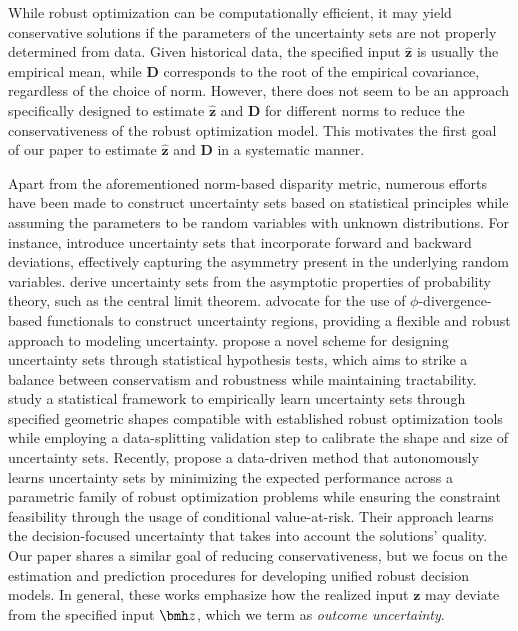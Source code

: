 \documentclass[opre, blindrev]{informs4}
\newcommand{\1}[1]{\mathds{1}{\left(#1\right)}}
\begin{document}
While robust optimization can be computationally efficient, it may yield conservative solutions if the parameters of the uncertainty sets are not properly determined from data. Given historical data, the specified input \( \bm{\hat{z}} \) is usually the empirical mean, while \( \mathbf{D} \) corresponds to the root of the empirical covariance, regardless of the choice of norm. However, there does not seem to be an approach specifically designed to estimate \( \bm{\hat{z}} \) and \( \mathbf{D} \) for different norms to reduce the conservativeness of the robust optimization model. This motivates the first goal of our paper to estimate \( \bm{\hat{z}} \) and \( \mathbf{D} \) in a systematic manner.

Apart from the aforementioned norm-based disparity metric, numerous efforts have been made to construct uncertainty sets based on statistical principles while assuming the parameters to be random variables with unknown distributions. For instance, \cite{Chen_Sim_Sun_2007robust} introduce uncertainty sets that incorporate forward and backward deviations, effectively capturing the asymmetry present in the underlying random variables. \cite{bandi2012tractable} derive uncertainty sets from the asymptotic properties of probability theory, such as the central limit theorem. \cite{ben2013robust} advocate for the use of $\phi$-divergence-based functionals to construct uncertainty regions, providing a flexible and robust approach to modeling uncertainty. \cite{Bertsimas_Gupta_Kallus_2018data} propose a novel scheme for designing uncertainty sets through statistical hypothesis tests, which aims to strike a balance between conservatism and robustness while maintaining tractability. \cite{hong2021learning} study a statistical framework to empirically learn uncertainty sets through specified geometric shapes compatible with established robust optimization tools while employing a data-splitting validation step to calibrate the shape and size of uncertainty sets. Recently, \cite{wang2023learning} propose a data-driven method that autonomously learns uncertainty sets by minimizing the expected performance across a parametric family of robust optimization problems while ensuring the constraint feasibility through the usage of conditional value-at-risk. Their approach learns the decision-focused uncertainty that takes into account the solutions' quality. Our paper shares a similar goal of reducing conservativeness, but we focus on the estimation and prediction procedures for developing unified robust decision models.
In general, these works emphasize how the realized input $\bm z$ may deviate from the specified input $\bmh z$, which we term as \emph{outcome uncertainty}.
\end{document}
